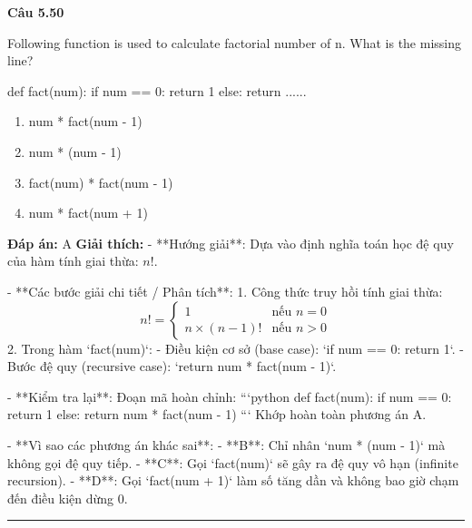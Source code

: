 \documentclass[11pt,a4paper]{article}
\newenvironment{question}[1]{%
  \par\vspace{1em}\noindent\textbf{\large Câu #1}\par\vspace{0.4em}
}{%
  \par\vspace{1em}\hrule\vspace{0.6em}
}
\newenvironment{choices}{%
  \begin{enumerate}[label=\textbf{\Alph*.},leftmargin=2.2em,itemsep=2pt,topsep=3pt]
}{%
  \end{enumerate}
}
\newcommand{\choice}{\item}
\newenvironment{codebox}{%
  \begin{tcolorbox}[colback=gray!8!white,colframe=gray!50!black,arc=1.5mm,boxrule=0.6pt,left=3mm,right=3mm,top=2.5mm,bottom=2.5mm]
  \ttfamily\small
}{%
  \end{tcolorbox}
}
\begin{document}
\begin{question}{5.50}
Following function is used to calculate factorial number of n. What is the missing line?
\begin{codebox}
def fact(num):
    if num == 0:
        return 1
    else:
        return ......
\end{codebox}
\begin{choices}
\choice num * fact(num - 1)
\choice num * (num - 1)
\choice fact(num) * fact(num - 1)
\choice num * fact(num + 1)
\end{choices}
\textbf{Đáp án:} A
\textbf{Giải thích:} - **Hướng giải**:
  Dựa vào định nghĩa toán học đệ quy của hàm tính giai thừa: \(n!\).

- **Các bước giải chi tiết / Phân tích**:
  1. Công thức truy hồi tính giai thừa:
     \[
     n! = \begin{cases} 1 & \text{nếu } n = 0 \\ n \times (n - 1)! & \text{nếu } n > 0 \end{cases}
     \]
  2. Trong hàm `fact(num)`:
     - Điều kiện cơ sở (base case): `if num == 0: return 1`.
     - Bước đệ quy (recursive case): `return num * fact(num - 1)`.

- **Kiểm tra lại**:
  Đoạn mã hoàn chỉnh:
  ```python
  def fact(num):
      if num == 0:
          return 1
      else:
          return num * fact(num - 1)
  ```
  Khớp hoàn toàn phương án A.

- **Vì sao các phương án khác sai**:
  - **B**: Chỉ nhân `num * (num - 1)` mà không gọi đệ quy tiếp.
  - **C**: Gọi `fact(num)` sẽ gây ra đệ quy vô hạn (infinite recursion).
  - **D**: Gọi `fact(num + 1)` làm số tăng dần và không bao giờ chạm đến điều kiện dừng 0.
\end{question}
\end{document}
